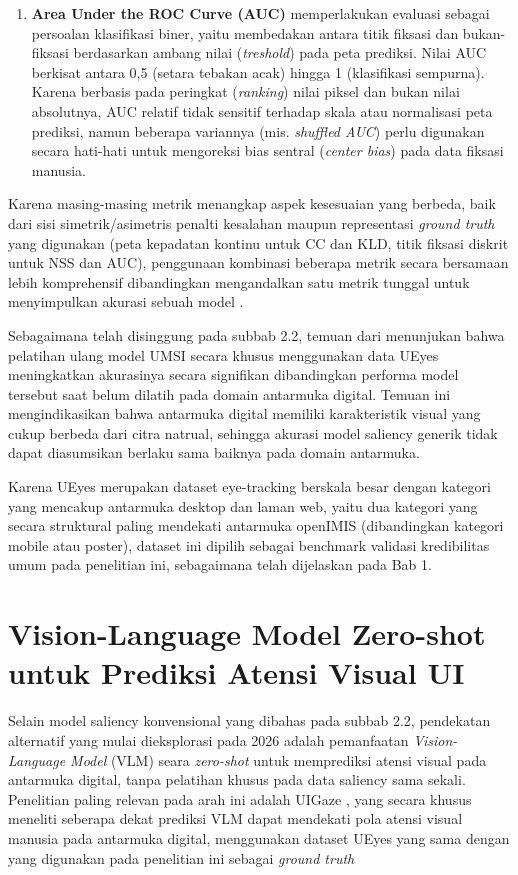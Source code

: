 \begin{enumerate}
    \item \textbf{Area Under the ROC Curve (AUC)} memperlakukan evaluasi sebagai persoalan klasifikasi biner, yaitu membedakan antara titik fiksasi dan bukan-fiksasi berdasarkan ambang nilai (\textit{treshold}) pada peta prediksi. Nilai AUC berkisat antara 0,5 (setara tebakan acak) hingga 1 (klasifikasi sempurna). Karena berbasis pada peringkat (\textit{ranking}) nilai piksel dan bukan nilai absolutnya, AUC relatif tidak sensitif terhadap skala atau normalisasi peta prediksi, namun beberapa variannya (mis. \textit{shuffled AUC}) perlu digunakan secara hati-hati untuk mengoreksi bias sentral (\textit{center bias}) pada data fiksasi manusia.
\end{enumerate}


Karena masing-masing metrik menangkap aspek kesesuaian yang berbeda, baik dari sisi simetrik/asimetris penalti kesalahan maupun representasi \textit{ground truth} yang digunakan (peta kepadatan kontinu untuk CC dan KLD, titik fiksasi diskrit untuk NSS dan AUC), penggunaan kombinasi beberapa metrik secara bersamaan lebih komprehensif dibandingkan mengandalkan satu metrik tunggal untuk menyimpulkan akurasi sebuah model \citep{bylinskii2019what}.

Sebagaimana telah disinggung pada subbab 2.2, temuan dari \citet{jiang2023ueyes} menunjukan bahwa pelatihan ulang model UMSI secara khusus menggunakan data UEyes meningkatkan akurasinya secara signifikan dibandingkan performa model tersebut saat belum dilatih pada domain antarmuka digital. Temuan ini mengindikasikan bahwa antarmuka digital memiliki karakteristik visual yang cukup berbeda dari citra natrual, sehingga akurasi model saliency generik tidak dapat diasumsikan berlaku sama baiknya pada domain antarmuka.

Karena UEyes merupakan dataset eye-tracking berskala besar dengan kategori yang mencakup antarmuka desktop dan laman web, yaitu dua kategori yang secara struktural paling mendekati antarmuka openIMIS (dibandingkan kategori mobile atau poster), dataset ini dipilih sebagai benchmark validasi kredibilitas umum pada penelitian ini, sebagaimana telah dijelaskan pada Bab 1.  

\section{Vision-Language Model Zero-shot untuk Prediksi Atensi Visual UI}

Selain model saliency konvensional yang dibahas pada subbab 2.2, pendekatan alternatif yang mulai dieksplorasi pada 2026 adalah pemanfaatan \textit{Vision-Language Model} (VLM) seara \textit{zero-shot} untuk memprediksi atensi visual pada antarmuka digital, tanpa pelatihan khusus pada data saliency sama sekali. Penelitian paling relevan pada arah ini adalah UIGaze \citep{song2026uigaze}, yang secara khusus meneliti seberapa dekat prediksi VLM dapat mendekati pola atensi visual manusia pada antarmuka digital, menggunakan dataset UEyes yang sama dengan yang digunakan pada penelitian ini sebagai \textit{ground truth}

